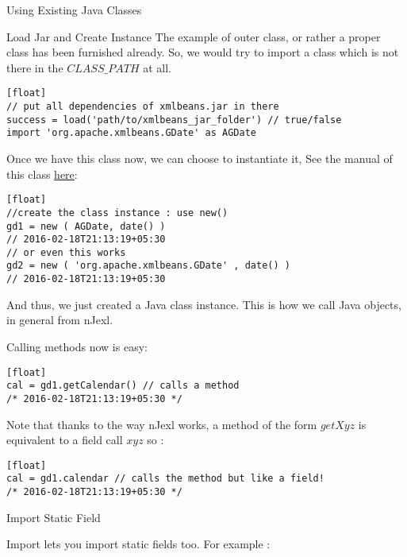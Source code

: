 \begin{section}{Using Existing Java Classes}

\begin{subsection}{Load Jar and Create Instance}
The example of outer class, or rather a proper class 
has been furnished already. So, we would try to import a class
which is not there in the $CLASS\_PATH$ at all.

\begin{lstlisting}[style=JexlStyle][float]
// put all dependencies of xmlbeans.jar in there
success = load('path/to/xmlbeans_jar_folder') // true/false 
import 'org.apache.xmlbeans.GDate' as AGDate
\end{lstlisting}

Once we have this class now, we can choose to instantiate it,
See the manual of this class \href{https://xmlbeans.apache.org/docs/2.1.0/reference/org/apache/xmlbeans/GDate.html}{here}:

\begin{lstlisting}[style=JexlStyle][float]
//create the class instance : use new() 
gd1 = new ( AGDate, date() )
// 2016-02-18T21:13:19+05:30
// or even this works 
gd2 = new ( 'org.apache.xmlbeans.GDate' , date() )
// 2016-02-18T21:13:19+05:30
\end{lstlisting}

And thus, we just created a Java class instance.
This is how we call Java objects, in general from nJexl.

Calling methods now is easy:

\begin{lstlisting}[style=JexlStyle][float]
cal = gd1.getCalendar() // calls a method 
/* 2016-02-18T21:13:19+05:30 */
\end{lstlisting}

Note that thanks to the way nJexl works, a method of the form $getXyz$
is equivalent to a field call $xyz$ so :

\begin{lstlisting}[style=JexlStyle][float]
cal = gd1.calendar // calls the method but like a field! 
/* 2016-02-18T21:13:19+05:30 */
\end{lstlisting}


\end{subsection}

\begin{subsection}{Import Static Field}

Import lets you import static fields too. For example :


\end{subsection}
\end{section}
